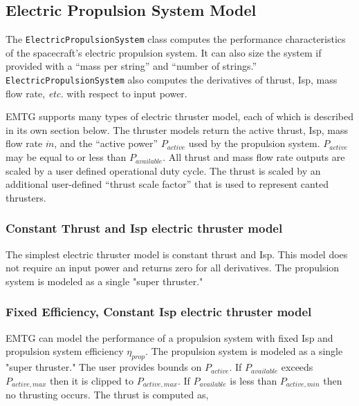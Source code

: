 \subsection{Electric Propulsion System Model}
\label{subsec:ElectricPropulsionSystem}

The \texttt{ElectricPropulsionSystem} class computes the performance characteristics of the spacecraft's electric propulsion system. It can also size the system if provided with a ``mass per string'' and ``number of strings.'' \texttt{ElectricPropulsionSystem} also computes the derivatives of thrust, \ac{Isp}, mass flow rate, \textit{etc.} with respect to input power.

\ac{EMTG} supports many types of electric thruster model, each of which is described in its own section below. The thruster models return the active thrust, \ac{Isp}, mass flow rate $\dot m$, and the ``active power'' $P_{active}$ used by the propulsion system. $P_{active}$ may be equal to or less than $P_{available}$. All thrust and mass flow rate outputs are scaled by a user defined operational duty cycle. The thrust is scaled by an additional user-defined ``thrust scale factor'' that is used to represent canted thrusters.

\subsubsection{Constant Thrust and \ac{Isp} electric thruster model}
\label{subsubsec:const_thrust_isp}

The simplest electric thruster model is constant thrust and \ac{Isp}. This model does not require an input power and returns zero for all derivatives. The propulsion system is modeled as a single "super thruster."

\subsubsection{Fixed Efficiency, Constant \ac{Isp} electric thruster model}
\label{subsubsec:fixed_efficiency_constant_Isp}

\ac{EMTG} can model the performance of a propulsion system with fixed \ac{Isp} and propulsion system efficiency $\eta_{prop}$. The propulsion system is modeled as a single "super thruster." The user provides bounds on $P_{active}$. If $P_{available}$ exceeds $P_{active,max}$ then it is clipped to $P_{active,max}$. If $P_{available}$ is less than $P_{active,min}$ then no thrusting occurs. The thrust is computed as,


